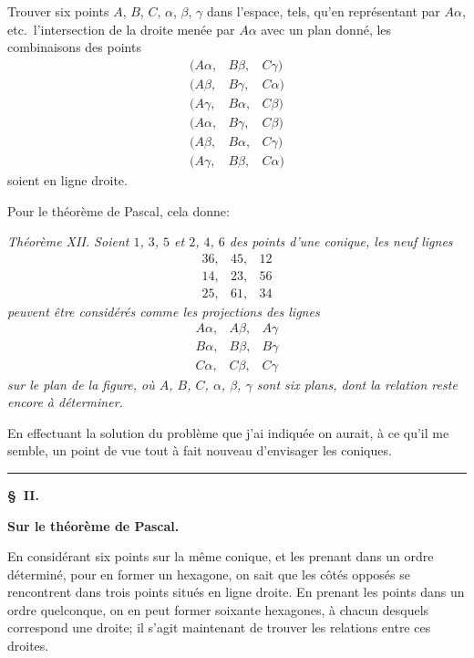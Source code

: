 \documentclass[11pt,a4paper]{book}
\begin{document}
Trouver six points $A$, $B$, $C$, $\alpha$, $\beta$, $\gamma$ dans l'espace, tels, qu'en repr\'esentant par $A\alpha$, etc.\ l'intersection de la droite men\'ee par $A\alpha$ avec un plan donn\'e, les combinaisons des points
\[
\begin{array}{ccc}
(A\alpha, & B\beta, & C\gamma) \\
(A\beta, & B\gamma, & C\alpha) \\
(A\gamma, & B\alpha, & C\beta) \\
(A\alpha, & B\gamma, & C\beta) \\
(A\beta, & B\alpha, & C\gamma) \\
(A\gamma, & B\beta, & C\alpha)
\end{array}
\]
soient en ligne droite.

Pour le th\'eor\`eme de Pascal, cela donne:

\smallskip
\textit{Th\'eor\`eme XII. Soient $1$, $3$, $5$ et $2$, $4$, $6$ des points d'une conique, les neuf lignes
\[
\begin{array}{ccc}
36, & 45, & 12 \\
14, & 23, & 56 \\
25, & 61, & 34
\end{array}
\]
peuvent \^etre consid\'er\'es comme les projections des lignes
\[
\begin{array}{ccc}
A\alpha, & A\beta, & A\gamma \\
B\alpha, & B\beta, & B\gamma \\
C\alpha, & C\beta, & C\gamma
\end{array}
\]
sur le plan de la figure, o\`u $A$, $B$, $C$, $\alpha$, $\beta$, $\gamma$ sont six plans, dont la relation reste encore \`a d\'eterminer.}
\smallskip

En effectuant la solution du probl\`eme que j'ai indiqu\'ee on aurait, \`a ce qu'il me semble, un point de vue tout \`a fait nouveau d'envisager les coniques.

\medskip
\hrule
\medskip

\textbf{\S\ II.}

\begin{center}\textbf{Sur le th\'eor\`eme de Pascal.}\end{center}

En consid\'erant six points sur la m\^eme conique, et les prenant dans un ordre d\'etermin\'e, pour en former un hexagone, on sait que les c\^ot\'es oppos\'es se rencontrent dans trois points situ\'es en ligne droite. En prenant les points dans un ordre quelconque, on en peut former soixante hexagones, \`a chacun desquels correspond une droite; il s'agit maintenant de trouver les relations entre ces droites.
\end{document}
